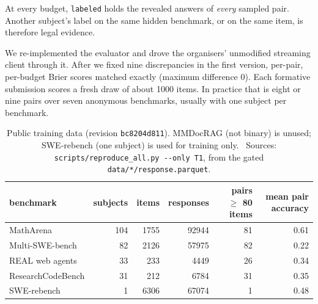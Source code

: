 \documentclass{article}
\newcommand{\src}[1]{{\footnotesize\ Sources: #1.}}
\newcommand{\p}[1]{\nolinkurl{#1}}
\begin{document}
\newpage
At every budget,
\texttt{labeled} holds the revealed answers of \emph{every} sampled pair. Another subject's label on the same hidden
benchmark, or on the same item, is therefore legal evidence.

We re-implemented the evaluator and drove the organisers' unmodified streaming client through it. After we fixed nine
discrepancies in the first version, per-pair, per-budget Brier scores matched exactly (maximum difference 0). Each
formative submission scores a fresh draw of about \num{1000} items. In practice that is eight or nine pairs over seven
anonymous benchmarks, usually with one subject per benchmark.

\begin{table}[H]
  \caption{Public training data (revision \texttt{bc8204d811}). MMDocRAG (not binary) is unused; SWE-rebench (one
  subject) is used for training only.
  \src{\texttt{scripts/reproduce\_all.py -{}-only T1}, from the gated \p{data/*/response.parquet}}}
  \label{tab:data}
  \centering\small
  \begin{tabular}{lrrrrr}
    \toprule
    benchmark & subjects & items & responses & pairs $\ge$ 80 items & mean pair accuracy\\
    \midrule
    MathArena          & 104 & \num{1755} & \num{92944} & 81 & 0.61\\
    Multi-SWE-bench    &  82 & \num{2126} & \num{57975} & 82 & 0.22\\
    REAL web agents    &  33 &  233 &  \num{4449} & 26 & 0.34\\
    ResearchCodeBench  &  31 &  212 &  \num{6784} & 31 & 0.35\\
    SWE-rebench        &   1 & \num{6306} & \num{67074} &  1 & 0.48\\
    \bottomrule
  \end{tabular}
\end{table}
\end{document}
